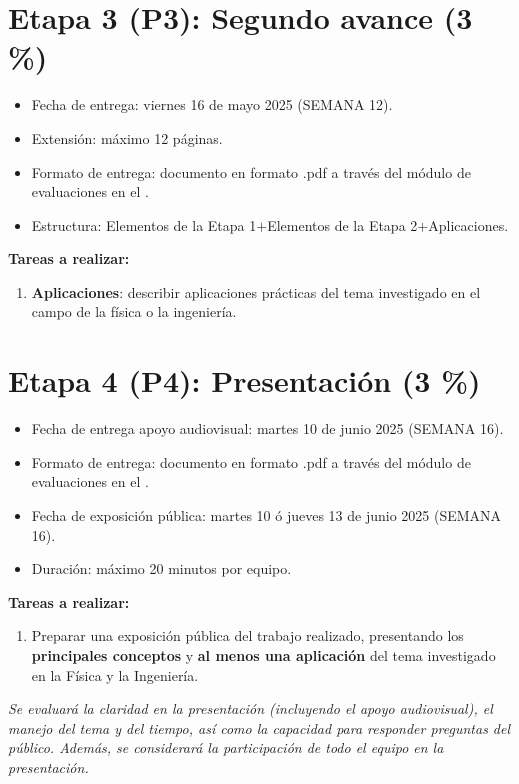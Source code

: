 \section*{Etapa 3 (P3): Segundo avance (3 \%)}

\begin{itemize}
    \item[\checkmark] Fecha de entrega: viernes 16 de mayo 2025 (SEMANA 12).
    \item[\checkmark] Extensi\'on:  m\'aximo 12 p\'aginas.
    \item[\checkmark] Formato de entrega: documento en formato .pdf a través del módulo de evaluaciones en el \td.
       
    \item[\checkmark] Estructura: 
     Elementos de la Etapa 1$+$Elementos de la Etapa 2$+$Aplicaciones.

\end{itemize}
\newpage
\textbf{Tareas a realizar:}

\begin{enumerate}
    \item \textbf{Aplicaciones}: describir aplicaciones prácticas del tema investigado en el campo de la física o la ingeniería.
\end{enumerate}






\section*{Etapa 4 (P4): Presentaci\'on (3 \%)}

\begin{itemize}
    \item[\checkmark] Fecha de entrega apoyo audiovisual: martes 10 de junio 2025 (SEMANA 16).
    \item[\checkmark] Formato de entrega: documento en formato .pdf a través del módulo de evaluaciones en el \td.
    \item[\checkmark] Fecha de exposici\'on pública: martes 10 \'o jueves 13 de junio 2025 (SEMANA 16).
    \item[\checkmark] Duraci\'on:  m\'aximo 20 minutos por equipo.
\end{itemize}

\textbf{Tareas a realizar:}
\begin{enumerate}
    \item Preparar una exposici\'on pública del trabajo realizado, presentando los \textbf{principales conceptos} y \textbf{al menos una aplicaci\'on} del tema investigado en la F\'isica y la Ingenier\'ia. 
\end{enumerate}

\textit{Se evaluará la claridad en la presentación (incluyendo el apoyo audiovisual), el manejo del tema y del tiempo, así como la capacidad para responder preguntas del público. Adem\'as, se considerar\'a la participaci\'on de todo el equipo en la presentaci\'on.}

